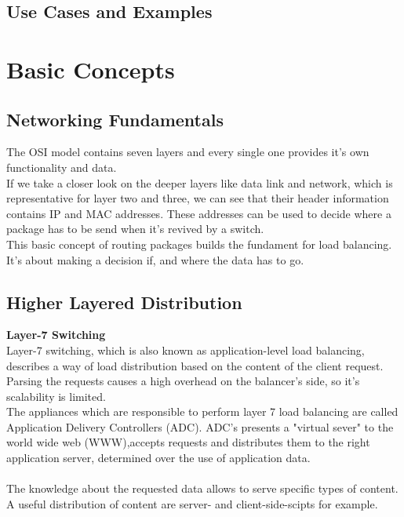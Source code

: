 \documentclass[12p]{article}
\begin{document}
	\subsection{Use Cases and Examples}
	
	\newpage
	\section{Basic Concepts}
	\subsection{Networking Fundamentals}
	The OSI model contains seven layers and every single one provides it's own functionality and data.\\
	If we take a closer look on the deeper layers like data link and network, which is representative for layer two and three, we can see that their header information contains IP and MAC addresses. These addresses can be used to decide where a package has to be send when it's revived by a switch.\\
	This basic concept of routing packages builds the fundament for load balancing. It's about making a decision if, and where the data has to go. \cite{lb_SFC}
	
	\subsection{Higher Layered Distribution}
	\textbf{Layer-7 Switching}\\
	Layer-7 switching, which is also known as application-level load balancing, describes a way of load distribution based on the content of the client request. Parsing the requests causes a high overhead on the balancer's side, so it's scalability is limited.\\
	The appliances which are responsible to perform layer 7 load balancing are called Application Delivery Controllers (\gls{ADC}). \gls{ADC}'s presents a "virtual sever" to the world wide web (\gls{WWW}),accepts requests and distributes them to the right application server, determined over the use of application data.\\
	\\
	The knowledge about the requested data allows to serve specific types of content. A useful distribution of content are server- and client-side-scipts for example. \cite{AppLayerBalancing}
	
\end{document}
